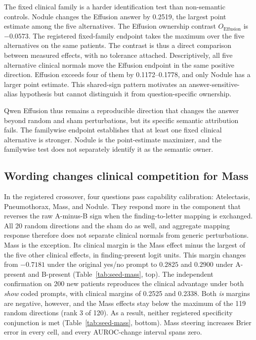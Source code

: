 The fixed clinical family is a harder identification test than non-semantic controls. Nodule changes the Effusion answer by 0.2519, the largest point estimate among the five alternatives. The Effusion ownership contrast $O_{\mathrm{Effusion}}$ is $-0.0573$. The registered fixed-family endpoint takes the maximum over the five alternatives on the same patients. The contrast is thus a direct comparison between measured effects, with no tolerance attached. Descriptively, all five alternative clinical normals move the Effusion endpoint in the same positive direction. Effusion exceeds four of them by 0.1172--0.1778, and only Nodule has a larger point estimate. This shared-sign pattern motivates an answer-sensitive-alias hypothesis but cannot distinguish it from question-specific ownership.

Qwen Effusion thus remains a reproducible direction that changes the answer beyond random and sham perturbations, but its specific semantic attribution fails. The familywise endpoint establishes that at least one fixed clinical alternative is stronger. Nodule is the point-estimate maximizer, and the familywise test does not separately identify it as the semantic owner.

\subsection{Wording changes clinical competition for Mass}
\label{sec:encoding-results}

In the registered crossover, four questions pass capability calibration: Atelectasis, Pneumothorax, Mass, and Nodule. They respond more in the component that reverses the raw A-minus-B sign when the finding-to-letter mapping is exchanged. All 20 random directions and the sham do as well, and aggregate mapping response therefore does not separate clinical normals from generic perturbations. Mass is the exception. Its clinical margin is the Mass effect minus the largest of the five other clinical effects, in finding-present logit units. This margin changes from $-0.7181$ under the original yes/no prompt to $0.2825$ and $0.2900$ under A-present and B-present (Table~\ref{tab:seed-mass}, top). The independent confirmation on 200 new patients reproduces the clinical advantage under both \textit{show} coded prompts, with clinical margins of 0.2525 and 0.2338. Both \textit{is} margins are negative, however, and the Mass effects stay below the maximum of the 119 random directions (rank 3 of 120). As a result, neither registered specificity conjunction is met (Table~\ref{tab:seed-mass}, bottom). Mass steering increases Brier error in every cell, and every AUROC-change interval spans zero.



